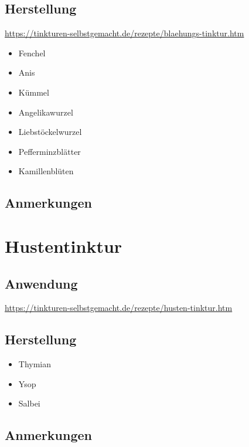 \subsection{Herstellung}

\cite{tinkturen}  \url{https://tinkturen-selbstgemacht.de/rezepte/blaehungs-tinktur.htm}

\begin{itemize}
	\item Fenchel
	\item Anis
	\item Kümmel
	\item Angelikawurzel
	\item Liebstöckelwurzel
	\item Pefferminzblätter
	\item Kamillenblüten
\end{itemize}

\subsection{Anmerkungen}




\section{Hustentinktur}

\subsection{Anwendung}

\cite{tinkturen}  \url{https://tinkturen-selbstgemacht.de/rezepte/husten-tinktur.htm} 

\subsection{Herstellung}


\begin{itemize}
	\item Thymian
	\item Ysop
	\item Salbei
\end{itemize}

\subsection{Anmerkungen}